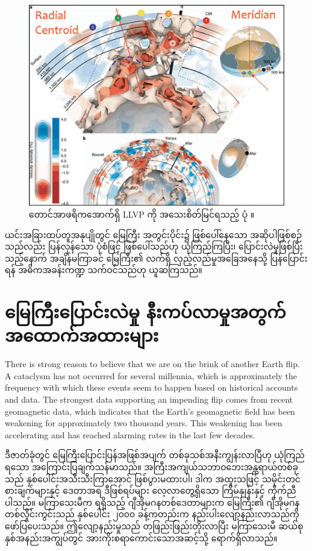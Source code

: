 \documentclass[10pt,twocolumn,letterpaper]{article}
\begin{document}
\begin{figure}[t]
\begin{center}
   \includegraphics[width=1\linewidth]{llvp.jpg}
\end{center}
   \caption{တောင်အာဖရိကအောက်ရှိ LLVP ကို အသေးစိတ်မြင်ရသည့် ပုံ \cite{28}။}
\label{fig:12}
\label{fig:onecol}
\end{figure}


ယင်းအခြားထပ်တူအနုပျိုတွင် မြေကြီး အတွင်းပိုင်း၌ ဖြစ်ပေါ်နေသော အဆိုပါဖြစ်စဉ်သည်လည်း ပြန်လှန်သော ပုံစံဖြင့် ဖြစ်ပေါ်သည်ဟု ယုံကြည်ကြပြီး၊ ပြောင်းလဲမှုဖြစ်ပြီးသည့်နောက် အချိန်မကြာခင် မြေကြီး၏ လက်ရှိ လှည့်လည်မှုအခြေအနေသို့ ပြန်ပြောင်းရန် အဓိကအခန်းကဏ္ဍ သက်ဝင်သည်ဟု ယူဆကြသည်။

\section{မြေကြီးပြောင်းလဲမှု နီးကပ်လာမှုအတွက် အထောက်အထားများ}
There is strong reason to believe that we are on the brink of another Earth flip. A cataclysm has not occurred for several millennia, which is approximately the frequency with which these events seem to happen based on historical accounts and data. The strongest data supporting an impending flip comes from recent geomagnetic data, which indicates that the Earth's geomagnetic field has been weakening for approximately two thousand years. This weakening has been accelerating and has reached alarming rates in the last few decades.

ဒီဇာတ်ခုံတွင် မြေကြီးပြောင်းပြန်အဖြစ်အပျက် တစ်ခုသစ်အနီးကျွန်းလာပြီဟု ယုံကြည်ရသော အကြောင်းပြချက်သန်မာသည်။ အကြီးအကျယ်သဘာဝဘေးအန္တရာယ်တစ်ခုသည် နှစ်ပေါင်းအသီးသီးကြာအောင် ဖြစ်ပွားမထားပါ၊ ဒါက အထူးသဖြင့် သမိုင်းတင်စားချက်များနှင့် ဒေတာအရ ဒီဖြစ်ရပ်များ လေ့လာတွေ့ရှိသော ကြိမ်နှုန်းနှင့် ကိုက်ညီပါသည်။ မကြာသေးမီက ရရှိသည့် ဂျီအိုမဂနတစ်ဒေတာများက မြေကြီး၏ ဂျီအိုမဂနတစ်လှိုင်းကွင်းသည် နှစ်ပေါင်း ၂၀၀၀ ခန့်ကတည်းက နည်းပါးလျော့နည်းလာသည်ကို ဖော်ပြပေးသည်။ ဤလျော့နည်းမှုသည် တဖြည်းဖြည်းတိုးလာပြီး မကြာသေးမီ ဆယ်စုနှစ်အနည်းအကျွပ်တွင် အားကိုးစရာကောင်းသောအဆင့်သို့ ရောက်ရှိလာသည်။
\end{document}
